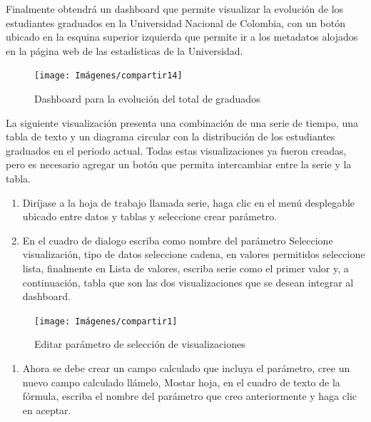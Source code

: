 \documentclass[
]{book}
\providecommand{\tightlist}{%
  \setlength{\itemsep}{0pt}\setlength{\parskip}{0pt}}
\begin{document}
Finalmente obtendrá un dashboard que permite visualizar la evolución de los estudiantes graduados en la Universidad Nacional de Colombia, con un botón ubicado en la esquina superior izquierda que permite ir a los metadatos alojados en la página web de las estadísticas de la Universidad.

\begin{figure}

{\centering \texttt{[image: Imágenes/compartir14]} 

}

\caption{Dashboard para la evolución del total de graduados}\label{fig:tableroevolucion-fig}
\end{figure}

La siguiente visualización presenta una combinación de una serie de tiempo, una tabla de texto y un diagrama circular con la distribución de los estudiantes graduados en el periodo actual. Todas estas visualizaciones ya fueron creadas, pero es necesario agregar un botón que permita intercambiar entre la serie y la tabla.

\begin{enumerate}
\def\labelenumi{\arabic{enumi}.}
\item
  Diríjase a la hoja de trabajo llamada serie, haga clic en el menú desplegable ubicado entre datos y tablas y seleccione crear parámetro.
\item
  En el cuadro de dialogo escriba como nombre del parámetro Seleccione visualización, tipo de datos seleccione cadena, en valores permitidos seleccione lista, finalmente en Lista de valores, escriba serie como el primer valor y, a continuación, tabla que son las dos visualizaciones que se desean integrar al dashboard.
\end{enumerate}

\begin{figure}

{\centering \texttt{[image: Imágenes/compartir1]} 

}

\caption{Editar parámetro de selección de visualizaciones}\label{fig:paso2tablero-fig}
\end{figure}

\begin{enumerate}
\def\labelenumi{\arabic{enumi}.}
\setcounter{enumi}{2}
\tightlist
\item
  Ahora se debe crear un campo calculado que incluya el parámetro, cree un nuevo campo calculado llámelo, Mostar hoja, en el cuadro de texto de la fórmula, escriba el nombre del parámetro que creo anteriormente y haga clic en aceptar.
\end{enumerate}
\end{document}
